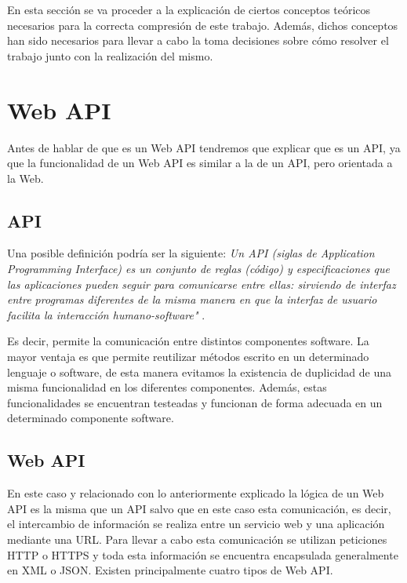 
En esta sección se va proceder a la explicación de ciertos conceptos teóricos necesarios para la correcta compresión de este trabajo. Además, dichos conceptos han sido necesarios para llevar a cabo la toma decisiones sobre cómo resolver el trabajo junto con la realización del mismo.


\section{Web API}

Antes de hablar de que es un Web API tendremos que explicar que es un API, ya que la funcionalidad de un Web API es similar a la de un API, pero orientada a la Web.

\subsection{API}

Una posible definición podría ser la siguiente: \emph{Un API (siglas de Application Programming Interface) es un conjunto de reglas (código) y especificaciones que las aplicaciones pueden seguir para comunicarse entre ellas: sirviendo de interfaz entre programas diferentes de la misma manera en que la interfaz de usuario facilita la interacción humano-software"} \cite{wiki:api}.





Es decir, permite la comunicación entre distintos componentes software. La mayor ventaja es que permite reutilizar métodos escrito en un determinado lenguaje o software, de esta manera evitamos la existencia de duplicidad de una misma funcionalidad en los diferentes componentes. Además, estas funcionalidades se encuentran testeadas y funcionan de forma adecuada en un determinado componente software.

\subsection{Web API}

En este caso y relacionado con lo anteriormente explicado la lógica de un Web API es la misma que un API salvo que en este caso esta comunicación, es decir, el intercambio de información se realiza entre un servicio web y una aplicación mediante una URL. Para llevar a cabo esta comunicación se utilizan peticiones HTTP o HTTPS y toda esta información se encuentra encapsulada generalmente en XML o JSON.
Existen principalmente cuatro tipos de Web API.

